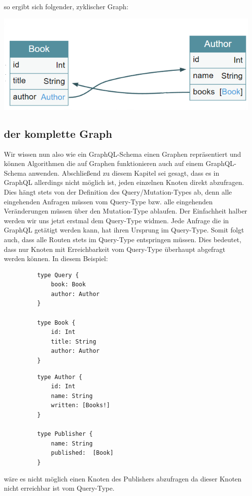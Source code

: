 so ergibt sich folgender, zyklischer Graph:

\begin{center}
    \includegraphics[width=\textwidth,height=\textheight,keepaspectratio]{img/book-author-circle}
\end{center}

\subsection{der komplette Graph}

Wir wissen nun also wie ein GraphQL-Schema einen Graphen repräsentiert und können Algorithmen die auf Graphen funktionieren auch
auf einem GraphQL-Schema anwenden.
Abschließend zu diesem Kapitel sei gesagt, dass es in GraphQL allerdings nicht möglich ist, jeden einzelnen Knoten direkt
abzufragen.
Dies hängt stets von der Definition des Query/Mutation-Types ab, denn alle eingehenden Anfragen müssen vom Query-Type bzw. alle
eingehenden Veränderungen müssen über den Mutation-Type ablaufen.
Der Einfachheit halber werden wir uns jetzt erstmal dem Query-Type widmen.
Jede Anfrage die in GraphQL getätigt werden kann, hat ihren Ursprung im Query-Type.
Somit folgt auch, dass alle Routen stets im Query-Type entspringen müssen.
Dies bedeutet, dass nur Knoten mit Erreichbarkeit vom Query-Type überhaupt abgefragt werden können.
In diesem Beispiel:

\begin{figure}[ht]
    \centering
    \begin{minipage}[b]{0.4\textwidth}
        \begin{verbatim}
    type Query {
        book: Book
        author: Author
    }

    type Book {
        id: Int
        title: String
        author: Author
    }
        \end{verbatim}
    \end{minipage}
    \hfill
    \begin{minipage}[b]{0.4\textwidth}
        \begin{verbatim}
    type Author {
        id: Int
        name: String
        written: [Books!]
    }

    type Publisher {
        name: String
        published:  [Book]
    }
        \end{verbatim}
    \end{minipage}
\end{figure}


wäre es nicht möglich einen Knoten des Publishers abzufragen da dieser Knoten nicht erreichbar ist vom Query-Type.
